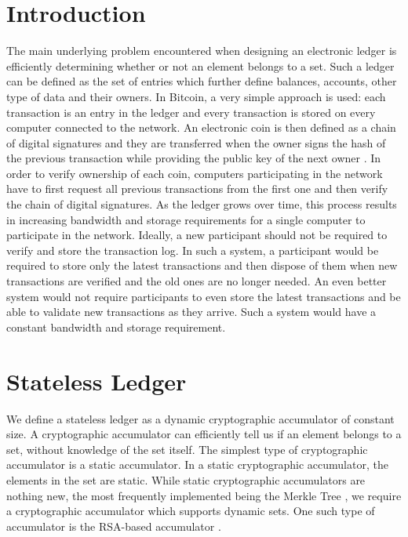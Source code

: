 \documentclass[notitlepage]{article}
\begin{document}
\section{Introduction}
The main underlying problem encountered when designing an electronic ledger is efficiently determining whether or not an element belongs to a set. Such a ledger can be defined as the set of entries which further define balances, accounts, other type of data and their owners. In Bitcoin, a very simple approach is used: each transaction is an entry in the ledger and every transaction is stored on every computer connected to the network. An electronic coin is then defined as a chain of digital signatures and they are transferred when the owner signs the hash of the previous transaction while providing the public key of the next owner \cite{btc}. In order to verify ownership of each coin, computers participating in the network have to first request all previous transactions from the first one and then verify the chain of digital signatures. As the ledger grows over time, this process results in increasing bandwidth and storage requirements for a single computer to participate in the network. Ideally, a new participant should not be required to verify and store the transaction log. In such a system, a participant would be required to store only the latest transactions and then dispose of them when new transactions are verified and the old ones are no longer needed. An even better system would not require participants to even store the latest transactions and be able to validate new transactions as they arrive. Such a system would have a constant bandwidth and storage requirement. 

\section{Stateless Ledger}
We define a stateless ledger as a dynamic cryptographic accumulator of constant size. A cryptographic accumulator can efficiently tell us if an element belongs to a set, without knowledge of the set itself.  The simplest type of cryptographic accumulator is a static accumulator. In a static cryptographic accumulator, the elements in the set are static. While static cryptographic accumulators are nothing new, the most frequently implemented being the Merkle Tree \cite{merkle}, we require a cryptographic accumulator which supports dynamic sets. One such type of accumulator is the RSA-based accumulator \cite{ca}.
\end{document}
